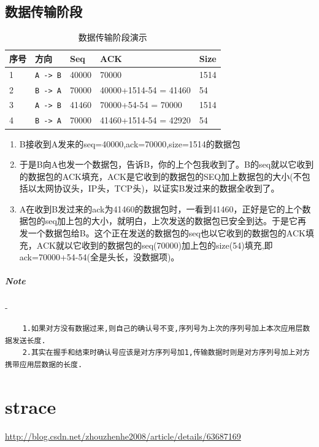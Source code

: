 \documentclass[UTF8,a4paper,8pt]{ctexbook}
\begin{document}
		\subsection{数据传输阶段}
			\begin{table}[htbp]
				\centering
				\caption{数据传输阶段演示}
				\begin{tabular}{m{1cm}|m{3cm}|m{4cm}|m{4cm}|m{1cm}}
					\toprule
						序号 & 方向 & Seq & ACK & Size\\
					\midrule
						1& \verb|A -> B|& 40000 & 70000 				&  1514 \\
						2& \verb|B -> A|& 70000 & 40000+1514-54 = 41460 &  54 \\
						3& \verb|A -> B|& 41460 & 70000+54-54 = 70000   &  1514 \\
						4& \verb|B -> A|& 70000 & 41460+1514-54 = 42920 &  54 \\
					\bottomrule
				\end{tabular}
			\end{table}
			\begin{enumerate}
				\item B接收到A发来的seq=40000,ack=70000,size=1514的数据包
				\item 于是B向A也发一个数据包，告诉B，你的上个包我收到了。B的seq就以它收到的数据包的ACK填充，ACK是它收到的数据包的SEQ加上数据包的大小(不包括以太网协议头，IP头，TCP头)，以证实B发过来的数据全收到了。
				\item A在收到B发过来的ack为41460的数据包时，一看到41460，正好是它的上个数据包的seq加上包的大小，就明白，上次发送的数据包已安全到达。于是它再发一个数据包给B。这个正在发送的数据包的seq也以它收到的数据包的ACK填充，ACK就以它收到的数据包的seq(70000)加上包的size(54)填充,即ack=70000+54-54(全是头长，没数据项)。
			\end{enumerate}
			
		\subparagraph{Note}-
		
			\begin{lstlisting}
	1.如果对方没有数据过来,则自己的确认号不变,序列号为上次的序列号加上本次应用层数据发送长度.
	2.其实在握手和结束时确认号应该是对方序列号加1,传输数据时则是对方序列号加上对方携带应用层数据的长度.
			\end{lstlisting}
	\section{strace}
		\url{http://blog.csdn.net/zhouzhenhe2008/article/details/63687169}
		
\end{document}
